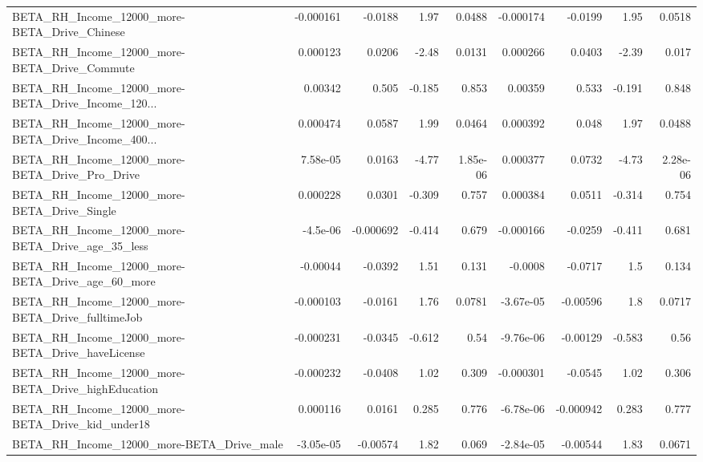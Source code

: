 \begin{tabular}{lrrrrrrrr}
BETA\_RH\_Income\_12000\_more-BETA\_Drive\_Chinese       &   -0.000161 &      -0.0188 &      1.97 &   0.0488 &  -0.000174 &     -0.0199 &         1.95 &        0.0518 \\
BETA\_RH\_Income\_12000\_more-BETA\_Drive\_Commute       &    0.000123 &       0.0206 &     -2.48 &   0.0131 &   0.000266 &      0.0403 &        -2.39 &         0.017 \\
BETA\_RH\_Income\_12000\_more-BETA\_Drive\_Income\_120... &     0.00342 &        0.505 &    -0.185 &    0.853 &    0.00359 &       0.533 &       -0.191 &         0.848 \\
BETA\_RH\_Income\_12000\_more-BETA\_Drive\_Income\_400... &    0.000474 &       0.0587 &      1.99 &   0.0464 &   0.000392 &       0.048 &         1.97 &        0.0488 \\
BETA\_RH\_Income\_12000\_more-BETA\_Drive\_Pro\_Drive     &    7.58e-05 &       0.0163 &     -4.77 & 1.85e-06 &   0.000377 &      0.0732 &        -4.73 &      2.28e-06 \\
BETA\_RH\_Income\_12000\_more-BETA\_Drive\_Single        &    0.000228 &       0.0301 &    -0.309 &    0.757 &   0.000384 &      0.0511 &       -0.314 &         0.754 \\
BETA\_RH\_Income\_12000\_more-BETA\_Drive\_age\_35\_less   &    -4.5e-06 &    -0.000692 &    -0.414 &    0.679 &  -0.000166 &     -0.0259 &       -0.411 &         0.681 \\
BETA\_RH\_Income\_12000\_more-BETA\_Drive\_age\_60\_more   &    -0.00044 &      -0.0392 &      1.51 &    0.131 &    -0.0008 &     -0.0717 &          1.5 &         0.134 \\
BETA\_RH\_Income\_12000\_more-BETA\_Drive\_fulltimeJob   &   -0.000103 &      -0.0161 &      1.76 &   0.0781 &  -3.67e-05 &    -0.00596 &          1.8 &        0.0717 \\
BETA\_RH\_Income\_12000\_more-BETA\_Drive\_haveLicense   &   -0.000231 &      -0.0345 &    -0.612 &     0.54 &  -9.76e-06 &    -0.00129 &       -0.583 &          0.56 \\
BETA\_RH\_Income\_12000\_more-BETA\_Drive\_highEducation &   -0.000232 &      -0.0408 &      1.02 &    0.309 &  -0.000301 &     -0.0545 &         1.02 &         0.306 \\
BETA\_RH\_Income\_12000\_more-BETA\_Drive\_kid\_under18   &    0.000116 &       0.0161 &     0.285 &    0.776 &  -6.78e-06 &   -0.000942 &        0.283 &         0.777 \\
BETA\_RH\_Income\_12000\_more-BETA\_Drive\_male          &   -3.05e-05 &     -0.00574 &      1.82 &    0.069 &  -2.84e-05 &    -0.00544 &         1.83 &        0.0671 \\

\end{tabular}
